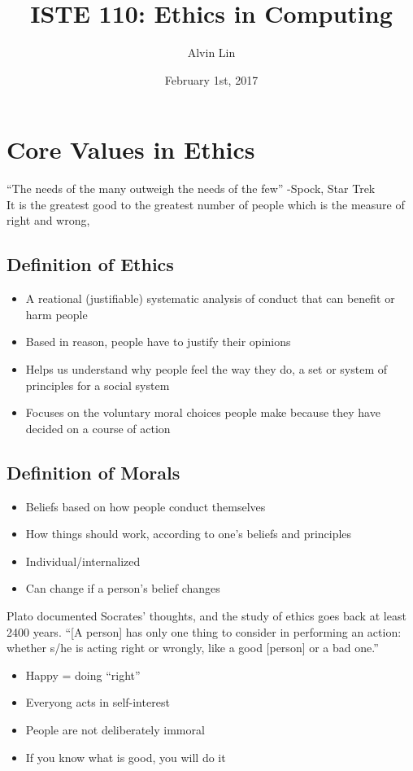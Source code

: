 \documentclass[letterpaper, 12pt]{article}
\title{ISTE 110: Ethics in Computing}
\author{Alvin Lin}
\date{February 1st, 2017}
\begin{document}
\maketitle

\section*{Core Values in Ethics}
``The needs of the many outweigh the needs of the few'' -Spock, Star Trek \\
It is the greatest good to the greatest number of people which is the measure of right and wrong,

\subsection*{Definition of Ethics}
\begin{itemize}
  \item A reational (justifiable) systematic analysis of conduct that can
    benefit or harm people
  \item Based in reason, people have to justify their opinions
  \item Helps us understand why people feel the way they do, a set or system of
    principles for a social system
  \item Focuses on the voluntary moral choices people make because they have
    decided on a course of action
\end{itemize}

\subsection*{Definition of Morals}
\begin{itemize}
  \item Beliefs based on how people conduct themselves
  \item How things should work, according to one's beliefs and principles
  \item Individual/internalized
  \item Can change if a person's belief changes
\end{itemize}
Plato documented Socrates' thoughts, and the study of ethics goes back at least 2400 years.
``[A person] has only one thing to consider in performing an action: whether
s/he is acting right or wrongly, like a good [person] or a bad one.''
\begin{itemize}
  \item Happy = doing ``right''
  \item Everyong acts in self-interest
  \item People are not deliberately immoral
  \item If you know what is good, you will do it
\end{itemize}
\end{document}
